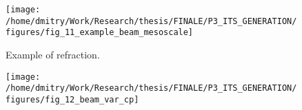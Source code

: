 \documentclass[12pt]{article}
\begin{document}
\begin{figure}
\centering
\texttt{[image: /home/dmitry/Work/Research/thesis/FINALE/P3\_ITS\_GENERATION/figures/fig\_11\_example\_beam\_mesoscale]}
\caption{Example of refraction. }
\label{C3.fig:fig_11_beam_mesoscale}
\end{figure}

\begin{figure}
\centering
\texttt{[image: /home/dmitry/Work/Research/thesis/FINALE/P3\_ITS\_GENERATION/figures/fig\_12\_beam\_var\_cp]}
\caption{}
\label{C3.fig:fig_12_beam_var_cp}
\end{figure}




\end{document}
